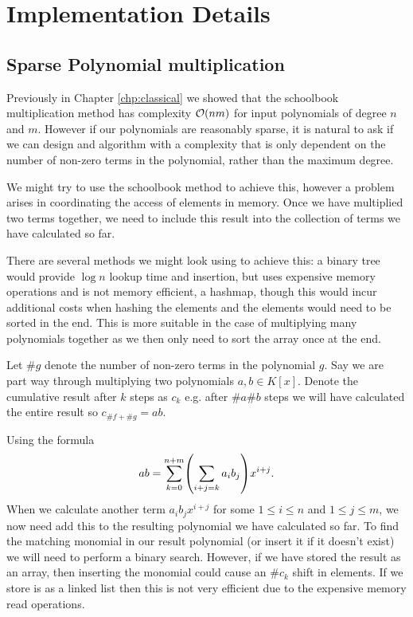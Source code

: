 \chapter{Implementation Details}\label{chp:implementation}

\section{Sparse Polynomial multiplication}

Previously in Chapter \ref{chp:classical} we showed that the schoolbook multiplication method has complexity $\mathcal O(nm)$ for input polynomials of degree $n$ and $m$. However if our polynomials are reasonably sparse, it is natural to ask if we can design and algorithm with a complexity that is only dependent on the number of non-zero terms in the polynomial, rather than the maximum degree. 

We might try to use the schoolbook method to achieve this, however a problem arises in coordinating the access of elements in memory. Once we have multiplied two terms together, we need to include this result into the collection of terms we have calculated so far. 

There are several methods we might look using to achieve this: a binary tree would provide $\log n$ lookup time and insertion, but uses expensive memory operations and is not memory efficient, a hashmap, though this would incur additional costs when hashing the elements and the elements would need to be sorted in the end. This is more suitable in the case of multiplying many polynomials together as we then only need to sort the array once at the end. 

Let $\# g$ denote the number of non-zero terms in the polynomial $g$. Say we are part way through multiplying two polynomials $a, b \in K[x]$. Denote the cumulative result after $k$ steps as $c_k$ e.g. after $\# a \# b$ steps we will have calculated the entire result so $c_{\#f + \#g} = ab$.


Using the formula
\[
    ab = \sum^{n + m}_{k=0} \bb{\sum_{i + j = k}a_ib_j} x^{i + j}.
\]
When we calculate another term $a_ib_j x^{i + j}$ for some $1 \le i \le n$ and $1 \le j \le m$, we now need add this to the resulting polynomial we have calculated so far. To find the matching monomial in our result polynomial (or insert it if it doesn't exist) we will need to perform a binary search. However, if we have stored the result as an array, then inserting the monomial could cause an $\#c_k$ shift in elements. If we store is as a linked list then this is not very efficient due to the expensive memory read operations.


